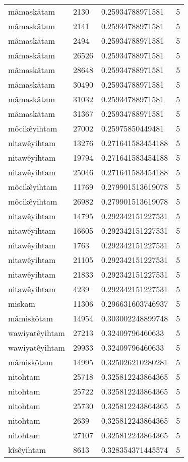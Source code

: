 \begin{longtable}{llll}
mâmaskâtam & 2130 & 0.25934788971581 & 5 \\
mâmaskâtam & 2141 & 0.25934788971581 & 5 \\
mâmaskâtam & 2494 & 0.25934788971581 & 5 \\
mâmaskâtam & 26526 & 0.25934788971581 & 5 \\
mâmaskâtam & 28648 & 0.25934788971581 & 5 \\
mâmaskâtam & 30490 & 0.25934788971581 & 5 \\
mâmaskâtam & 31032 & 0.25934788971581 & 5 \\
mâmaskâtam & 31367 & 0.25934788971581 & 5 \\
môcikêyihtam & 27002 & 0.25975850449481 & 5 \\
nitawêyihtam & 13276 & 0.271641583454188 & 5 \\
nitawêyihtam & 19794 & 0.271641583454188 & 5 \\
nitawêyihtam & 25046 & 0.271641583454188 & 5 \\
môcikêyihtam & 11769 & 0.279901513619078 & 5 \\
môcikêyihtam & 26982 & 0.279901513619078 & 5 \\
nitawêyihtam & 14795 & 0.292342151227531 & 5 \\
nitawêyihtam & 16605 & 0.292342151227531 & 5 \\
nitawêyihtam & 1763 & 0.292342151227531 & 5 \\
nitawêyihtam & 21105 & 0.292342151227531 & 5 \\
nitawêyihtam & 21833 & 0.292342151227531 & 5 \\
nitawêyihtam & 4239 & 0.292342151227531 & 5 \\
miskam & 11306 & 0.296631603746937 & 5 \\
mâmiskôtam & 14954 & 0.303002248899748 & 5 \\
wawiyatêyihtam & 27213 & 0.32409796460633 & 5 \\
wawiyatêyihtam & 29933 & 0.32409796460633 & 5 \\
mâmiskôtam & 14995 & 0.325026210280281 & 5 \\
nitohtam & 25718 & 0.325812243864365 & 5 \\
nitohtam & 25722 & 0.325812243864365 & 5 \\
nitohtam & 25730 & 0.325812243864365 & 5 \\
nitohtam & 2639 & 0.325812243864365 & 5 \\
nitohtam & 27107 & 0.325812243864365 & 5 \\
kîsêyihtam & 8613 & 0.328354371445574 & 5 \\

\end{longtable}
